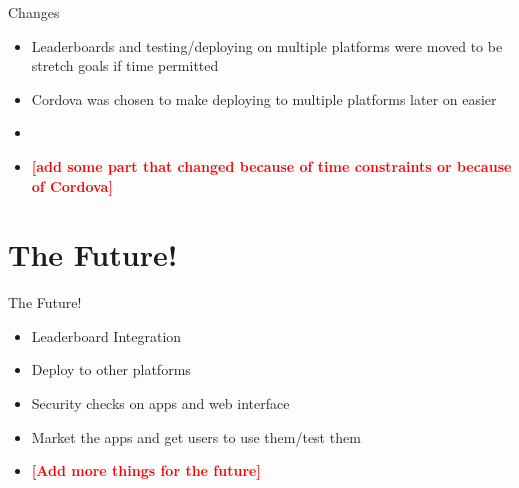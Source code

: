 \documentclass[aspectratio=169]{beamer}
\newcommand{\todo}[1]{\textcolor{red}{\textbf{[#1]}}}
\begin{document}
\begin{frame}{Changes}
	\begin{itemize}

		\item Leaderboards and testing/deploying on multiple platforms were moved to
					be stretch goals if time permitted

		\item Cordova was chosen to make deploying to multiple platforms later on
					easier

		\item 

		\item \todo{add some part that changed because of time constraints or because of Cordova}

	\end{itemize}
\end{frame}

\section{The Future!}

\begin{frame}{The Future!}
	\begin{itemize}
		
		\item Leaderboard Integration

		\item Deploy to other platforms

		\item Security checks on apps and web interface

		\item Market the apps and get users to use them/test them

		\item \todo{Add more things for the future}

	\end{itemize}
\end{frame}

\end{document}

